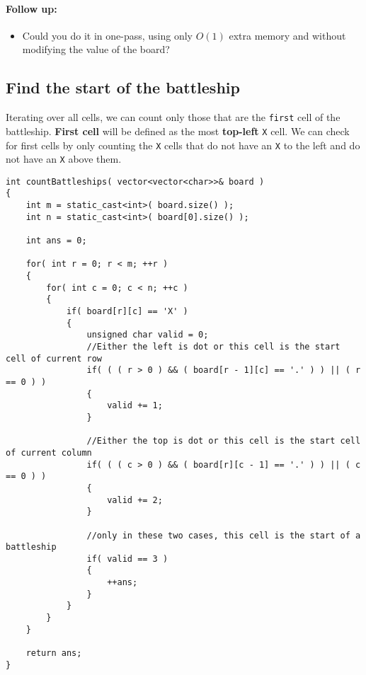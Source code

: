 \paragraph{Follow up:}
\begin{itemize}
\item Could you do it in one-pass, using only $O(1)$ extra memory and without modifying the value of the board?
\end{itemize}

\subsection{Find the start of the battleship}
Iterating over all cells, we can count only those that are the \texttt{first} cell of the battleship. \textbf{First cell} will be defined as the most \textbf{top-left} \texttt{X} cell. We can check for first cells by only counting the \texttt{X} cells that do not have an \texttt{X} to the left and do not have an \texttt{X} above them.

\setcounter{lstlisting}{0}
\begin{lstlisting}[style=customc, caption={Top-left cell}]
int countBattleships( vector<vector<char>>& board )
{
    int m = static_cast<int>( board.size() );
    int n = static_cast<int>( board[0].size() );

    int ans = 0;

    for( int r = 0; r < m; ++r )
    {
        for( int c = 0; c < n; ++c )
        {
            if( board[r][c] == 'X' )
            {
                unsigned char valid = 0;
                //Either the left is dot or this cell is the start cell of current row
                if( ( ( r > 0 ) && ( board[r - 1][c] == '.' ) ) || ( r == 0 ) )
                {
                    valid += 1;
                }

                //Either the top is dot or this cell is the start cell of current column
                if( ( ( c > 0 ) && ( board[r][c - 1] == '.' ) ) || ( c == 0 ) )
                {
                    valid += 2;
                }

                //only in these two cases, this cell is the start of a battleship
                if( valid == 3 )
                {
                    ++ans;
                }
            }
        }
    }

    return ans;
}
\end{lstlisting}
